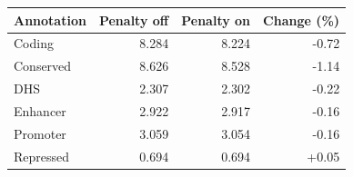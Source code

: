 \begin{tabular}{lrrr}
\toprule
Annotation & Penalty off & Penalty on & Change (\%) \\
\midrule
Coding & 8.284 & 8.224 & -0.72 \\
Conserved & 8.626 & 8.528 & -1.14 \\
DHS & 2.307 & 2.302 & -0.22 \\
Enhancer & 2.922 & 2.917 & -0.16 \\
Promoter & 3.059 & 3.054 & -0.16 \\
Repressed & 0.694 & 0.694 & +0.05 \\
\bottomrule
\end{tabular}
